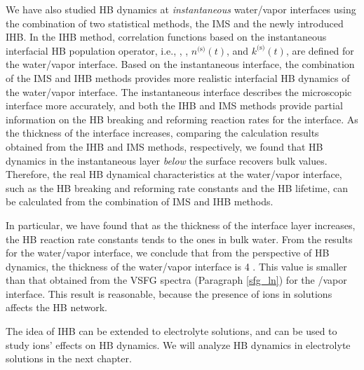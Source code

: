We have also studied HB dynamics at \emph{instantaneous} water/vapor interfaces using the combination 
of two statistical methods, the IMS and the newly introduced IHB.
In the IHB method, correlation functions based on the instantaneous interfacial HB population operator, i.e., \CSHB, \SSHB, $n^\text{(s)}(t)$, and $k^\text{(s)}(t)$, are defined for the water/vapor interface.
Based on the instantaneous interface, the combination of the IMS and
IHB methods provides more realistic interfacial HB dynamics of the water/vapor interface.  
The instantaneous interface describes the microscopic interface more accurately, 
and both the IHB and IMS methods provide partial information on the HB breaking and reforming reaction rates for the interface. 
As the thickness of the interface increases, comparing the calculation results obtained from the IHB and IMS methods, respectively, 
we found that HB dynamics in the instantaneous layer \emph{below} the surface recovers bulk values. 
Therefore, the real HB dynamical characteristics at the water/vapor interface, such as the HB breaking and reforming rate constants and the HB lifetime, 
can be calculated from the combination of IMS and IHB methods. 

In particular, we have found that as the thickness of the interface layer increases, 
the HB reaction rate constants tends to the ones in bulk water.
From the results for the water/vapor interface, we conclude that from the perspective of HB dynamics,
the thickness of the water/vapor interface is 4 \A. This value is smaller than that obtained from the VSFG spectra 
(Paragraph \thinspace\ref{sfg_ln}) for the \LiN/vapor interface. 
This result is reasonable, because the presence of ions in solutions affects the HB network. 

The idea of IHB can be extended to electrolyte solutions, and can be used to study ions' effects on HB dynamics.
We will analyze HB dynamics in electrolyte solutions in the next chapter.


